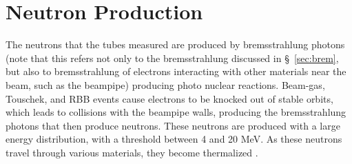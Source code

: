 \section{Neutron Production}



The neutrons that the \he tubes measured are produced by bremsstrahlung photons (note that this refers not only to the bremsstrahlung discussed in \S~\ref{sec:brem}, but also to bremsstrahlung of electrons interacting with other materials near the beam, such as the beampipe) producing photo nuclear reactions. Beam-gas, Touschek, and RBB events cause electrons to be knocked out of stable orbits, which leads to collisions with the beampipe walls, producing the bremsstrahlung photons that then produce neutrons. These neutrons are produced with a large energy distribution, with a threshold between 4 and 20 MeV. As these neutrons travel through various materials, they become thermalized \cite{PDGBook}.











































